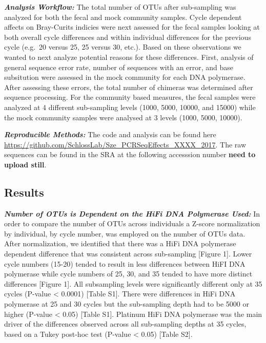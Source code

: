 \documentclass[12pt,]{article}
\begin{document}
\textbf{\emph{Analysis Workflow:}} The total number of OTUs after
sub-sampling was analyzed for both the fecal and mock community samples.
Cycle dependent affects on Bray-Curits indicies were next assessed for
the fecal samples looking at both overall cycle differences and within
individual differences for the previous cycle (e.g.~20 versus 25, 25
versus 30, etc.). Based on these observations we wanted to next analyze
potential reasons for these differences. First, analysis of general
sequence error rate, number of sequences with an error, and base
subsitution were assessed in the mock community for each DNA polymerase.
After assessing these errors, the total number of chimeras was
determined after sequence processing. For the community based measures,
the fecal samples were analyzed at 4 different sub-sampling levels
(1000, 5000, 10000, and 15000) while the mock community samples were
analysed at 3 levels (1000, 5000, 10000).

\textbf{\emph{Reproducible Methods:}} The code and analysis can be found
here \url{https://github.com/SchlossLab/Sze_PCRSeqEffects_XXXX_2017}.
The raw sequences can be found in the SRA at the following accesssion
number \textbf{need to upload still}.

\newpage

\subsection{Results}\label{results}

\textbf{\emph{Number of OTUs is Dependent on the HiFi DNA Polymerase
Used:}} In order to compare the number of OTUs across individuals a
Z-score normalization by individual, by cycle number, was employed on
the number of OTUs data. After normalization, we identified that there
was a HiFi DNA polymerase dependent difference that was consistent
across sub-sampling {[}Figure 1{]}. Lower cycle numbers (15-20) tended
to result in less differences between HiFI DNA polymerase while cycle
numbers of 25, 30, and 35 tended to have more distinct differences
{[}Figure 1{]}. All subsampling levels were significantly different only
at 35 cycles (P-value \textless{} 0.0001) {[}Table S1{]}. There were
differences in HiFi DNA polymerase at 25 and 30 cycles but the
sub-sampling depth had to be 5000 or higher (P-value \textless{} 0.05)
{[}Table S1{]}. Platinum HiFi DNA polymerase was the main driver of the
differences observed across all sub-sampling depths at 35 cycles, based
on a Tukey post-hoc test (P-value \textless{} 0.05) {[}Table S2{]}.
\end{document}
